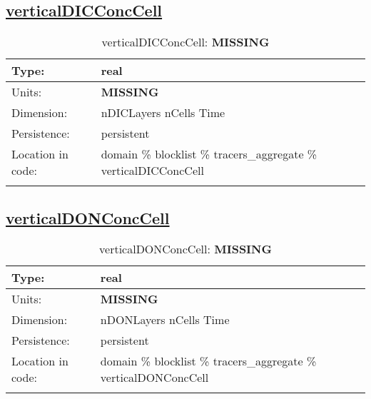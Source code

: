 \subsection[verticalDICConcCell]{\hyperref[sec:var_tab_tracers_aggregate]{verticalDICConcCell}}
\label{subsec:var_sec_tracers_aggregate_verticalDICConcCell}
\begin{center}
\begin{longtable}{| p{2.0in} | p{4.0in} |}
        \hline 
        Type: & real \\
        \hline 
        Units: & {\bf \color{red} MISSING} \\
        \hline 
        Dimension: & nDICLayers nCells Time \\
        \hline 
        Persistence: & persistent \\
        \hline 
         Location in code: & domain \% blocklist \% tracers\_aggregate \% verticalDICConcCell \\
         \hline 
    \caption{verticalDICConcCell: {\bf \color{red} MISSING}}
\end{longtable}
\end{center}
\subsection[verticalDONConcCell]{\hyperref[sec:var_tab_tracers_aggregate]{verticalDONConcCell}}
\label{subsec:var_sec_tracers_aggregate_verticalDONConcCell}
\begin{center}
\begin{longtable}{| p{2.0in} | p{4.0in} |}
        \hline 
        Type: & real \\
        \hline 
        Units: & {\bf \color{red} MISSING} \\
        \hline 
        Dimension: & nDONLayers nCells Time \\
        \hline 
        Persistence: & persistent \\
        \hline 
         Location in code: & domain \% blocklist \% tracers\_aggregate \% verticalDONConcCell \\
         \hline 
    \caption{verticalDONConcCell: {\bf \color{red} MISSING}}
\end{longtable}
\end{center}

